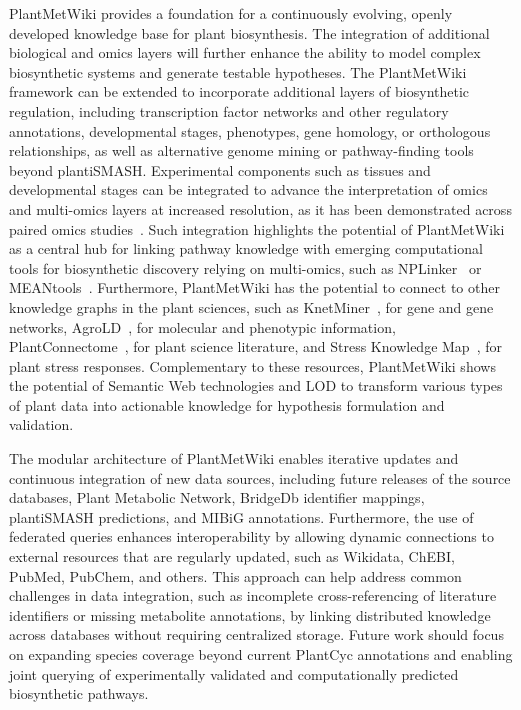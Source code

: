 \documentclass[11pt,a4paper]{article}
\begin{document}
PlantMetWiki provides a foundation for a continuously evolving, openly developed knowledge base for
plant biosynthesis. The integration of additional biological and omics layers will further enhance
the ability to model complex biosynthetic systems and generate testable hypotheses. The PlantMetWiki
framework can be extended to incorporate additional layers of biosynthetic regulation, including
transcription factor networks and other regulatory annotations, developmental stages, phenotypes,
gene homology, or orthologous relationships, as well as alternative genome mining or pathway-finding
tools beyond plantiSMASH. Experimental components such as tissues and developmental stages can be
integrated to advance the interpretation of omics and multi-omics layers at increased resolution, as
it has been demonstrated across paired omics studies~\cite{wolters2024,barrios2026,jeon2020}. Such
integration highlights the potential of PlantMetWiki as a central hub for linking pathway knowledge
with emerging computational tools for biosynthetic discovery relying on multi-omics, such as
NPLinker~\cite{geng2026} or MEANtools~\cite{singhk2025}. Furthermore, PlantMetWiki has the potential to
connect to other knowledge graphs in the plant sciences, such as KnetMiner~\cite{hassanipak2021}, for
gene and gene networks, AgroLD~\cite{larmande2025}, for molecular and phenotypic information,
PlantConnectome~\cite{lim2025}, for plant science literature, and Stress Knowledge
Map~\cite{bleker2024}, for plant stress responses. Complementary to these resources, PlantMetWiki
shows the potential of Semantic Web technologies and LOD to transform various types of plant data
into actionable knowledge for hypothesis formulation and validation.

The modular architecture of PlantMetWiki enables iterative updates and continuous integration of new
data sources, including future releases of the source databases, Plant Metabolic Network, BridgeDb
identifier mappings, plantiSMASH predictions, and MIBiG annotations. Furthermore, the use of
federated queries enhances interoperability by allowing dynamic connections to external resources
that are regularly updated, such as Wikidata, ChEBI, PubMed, PubChem, and others. This approach can
help address common challenges in data integration, such as incomplete cross-referencing of
literature identifiers or missing metabolite annotations, by linking distributed knowledge across
databases without requiring centralized storage. Future work should focus on expanding species
coverage beyond current PlantCyc annotations and enabling joint querying of experimentally validated
and computationally predicted biosynthetic pathways.
\end{document}
